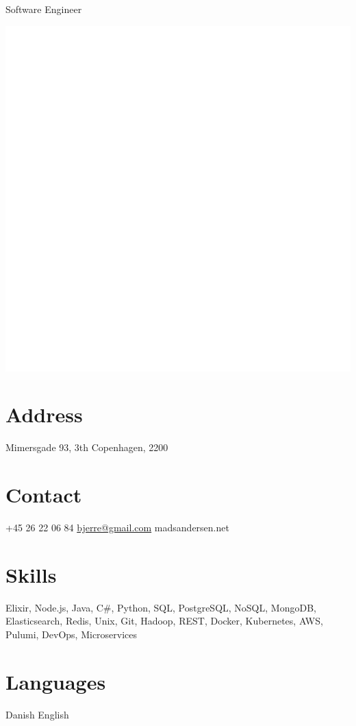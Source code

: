 \documentclass[]{friggeri-cv}
\begin{document}
      {Software Engineer}


\begin{aside}
  \includegraphics[scale=0.0382]{img/transparent.png}
  \section{Address}
    Mimersgade 93, 3th
    Copenhagen, 2200
    ~
  \section{Contact}
    +45 26 22 06 84
    \href{mailto:bjerre@gmail.com}{bjerre@gmail.com}
    madsandersen.net
    ~
  \section{Skills}
    Elixir, Node.js, Java, C\#, Python, SQL, PostgreSQL, NoSQL, MongoDB, Elasticsearch, Redis, Unix, Git, Hadoop, REST, Docker, Kubernetes, AWS, Pulumi, DevOps, Microservices
    ~
  \section{Languages}
    Danish
    English
    ~
\end{aside}
~
\end{document}
